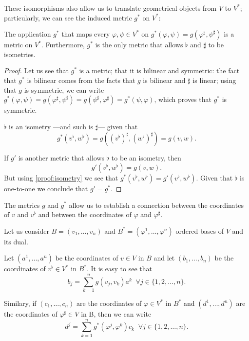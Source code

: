 These isomorphisms also allow us to translate geometrical objects from $V$ to $V^*$; particularly, we can see the induced metric $g^*$ on $V^*$:

\begin{proposition}
	The application $g^*$ that maps every $\varphi, \psi \in V^*$ on $g^*(\varphi,\psi) = g(\varphi^\sharp, \psi^\sharp)$ is a metric on $V^*$. Furthermore, $g^*$ is the only metric that allows $\flat$ and $\sharp$ to be isometries.
\end{proposition}

\begin{proof}
	Let us see that $g^*$ is a metric; \ie that it is bilinear and symmetric: the fact that $g^*$ is bilinear comes from the facts that $g$ is bilinear and $\sharp$ is linear; using that $g$ is symmetric, we can write $g^*(\varphi, \psi) = g(\varphi^\sharp, \psi^\sharp) = g(\psi^\sharp, \varphi^\sharp) = g^*(\psi, \varphi)$, which proves that $g^*$ is symmetric.
	
	$\flat$ is an isometry ---and such is $\sharp$--- given that
	\begin{equation}
		\label{proof:isometry}
		g^*(v^\flat, w^\flat) = g\left(\left(v^\flat\right)^\sharp, \left(w^\flat\right)^\sharp\right) = g(v, w).
	\end{equation}

	If $g'$ is another metric that allows $\flat$ to be an isometry, then \[g'(v^\flat, w^\flat) = g(v, w).\] But using \autoref{proof:isometry} we see that $g^*(v^\flat, w^\flat) = g'(v^\flat, w^\flat)$. Given that $\flat$ is one\nobreakdash-to\nobreakdash-one we conclude that $g' = g^*$.
\end{proof}

The metrics $g$ and $g^*$ allow us to establish a connection between the coordinates of $v$ and $v^\flat$ and between the coordinates of $\varphi$ and $\varphi^\sharp$.

Let us consider $B = (v_1, \dots, v_n)$ and $B^* = (\varphi^1, \dots, \varphi^n)$ ordered bases of $V$ and its dual.

Let $(a^1, \dots, a^n)$ be the coordinates of $v \in V$ in $B$ and let $(b_1, \dots, b_n)$ be the coordinates of $v^\flat \in V^*$ in $B^*$. It is easy to see that
\begin{equation}
	\label{eq:coordV}
	b_j = \sum_{k=1}^n g(v_j, v_k) a^k \;\; \forall j \in \{1,2,\dots,n\}.
\end{equation}

Similary, if $(c_1, \dots, c_n)$ are the coordinates of $\varphi \in V^*$ in $B^*$ and $(d^1, \dots, d^n)$ are the coordinates of $\varphi^\sharp \in V$ in B, then we can write
\begin{equation}
	\label{eq:coordV*}
	d^j = \sum_{k=1}^n g^*(\varphi^j, \varphi^k) c_k \;\; \forall j \in \{1,2,\dots,n\}.
\end{equation}


